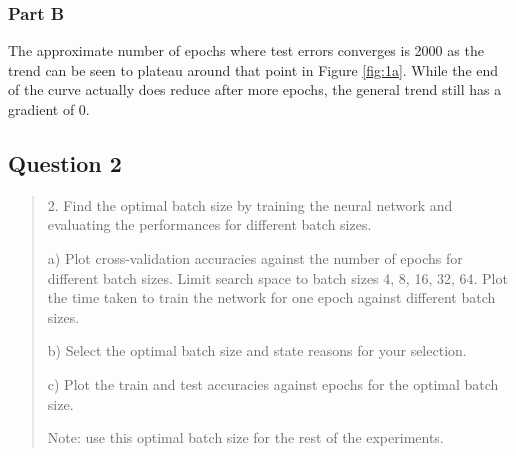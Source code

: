 \subsubsection{Part B}
The approximate number of epochs where test errors converges is 2000 as the trend can be seen to plateau around that point in Figure \ref{fig:1a}. While the end of the curve actually does reduce after more epochs, the general trend still has a gradient of 0.

\subsection{Question 2}
\label{1q2}
\begin{quote}
2. Find the optimal batch size by training the neural network and evaluating the performances for different batch sizes.

a) Plot cross-validation accuracies against the number of epochs for different batch sizes. Limit search space to batch sizes {4, 8, 16, 32, 64}. Plot the time taken to train the network for one epoch against different batch sizes.

b) Select the optimal batch size and state reasons for your selection.

c) Plot the train and test accuracies against epochs for the optimal batch size.

 Note: use this optimal batch size for the rest of the experiments.
\end{quote}

